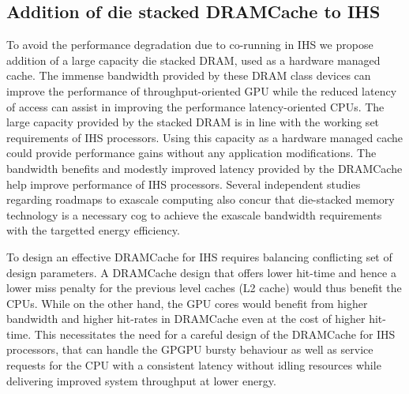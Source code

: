 \subsection{Addition of die stacked DRAMCache to IHS}
To avoid the performance degradation due to co-running in IHS we propose addition of a large capacity die stacked DRAM, used as a hardware managed cache. The immense bandwidth provided by these DRAM class devices can improve the performance of throughput-oriented GPU while the reduced latency of access can assist in improving the performance latency-oriented CPUs. The large capacity provided by the stacked DRAM is in line with the working set requirements of IHS processors. Using this capacity as a hardware managed cache could provide performance gains without any application modifications. The bandwidth benefits and modestly improved latency provided by the DRAMCache help improve performance of IHS processors. Several independent studies regarding roadmaps to exascale computing \cite{apu-exascale,amd-exascale1} also concur that die-stacked memory technology is a necessary cog to achieve the exascale bandwidth requirements with the targetted energy efficiency. 
\par To design an effective DRAMCache for IHS requires balancing conflicting set of design parameters. A DRAMCache design that offers lower hit-time and hence a lower miss penalty for the previous level caches (L2 cache) would thus benefit the CPUs. While on the other hand, the GPU cores would benefit from higher bandwidth and higher hit-rates in DRAMCache even at the cost of higher hit-time. This necessitates the need for a careful design of the DRAMCache for IHS processors, that can handle the GPGPU bursty behaviour as well as service requests for the CPU with a consistent latency without idling resources while delivering improved system throughput at lower energy.

